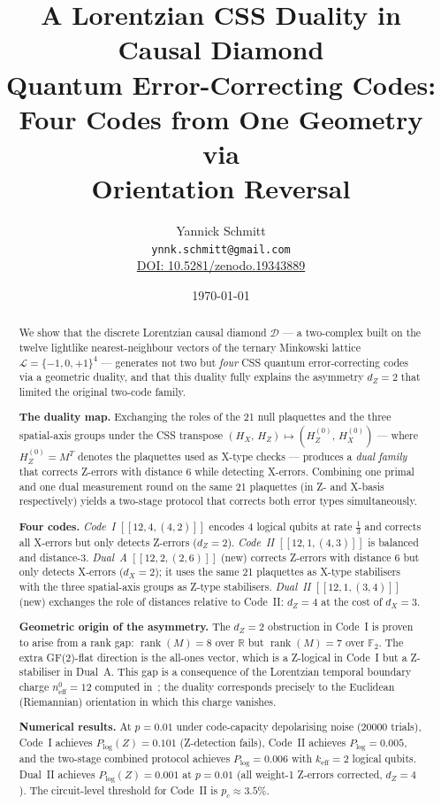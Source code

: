 \documentclass[12pt,a4paper]{article}
\title{\Large\bfseries A Lorentzian CSS Duality in Causal Diamond\\[4pt]
Quantum Error-Correcting Codes:\\[4pt]
Four Codes from One Geometry via\\[4pt]
Orientation Reversal}
\author{Yannick Schmitt \\ 
\texttt{ynnk.schmitt@gmail.com} \\
\vspace{4pt} 
\href{https://doi.org/10.5281/zenodo.19343889}{DOI: 10.5281/zenodo.19343889}}
\date{\today}
\theoremstyle{plain}
\theoremstyle{definition}
\theoremstyle{remark}
\newcommand{\GFtwo}{\mathbb{F}_2}
\newcommand{\R}{\mathbb{R}}
\newcommand{\rank}{\operatorname{rank}}
\newcommand{\CD}{\mathscr{D}}
\newcommand{\Lat}{\mathscr{L}}
\begin{document}
\maketitle

\begin{abstract}
We show that the discrete Lorentzian causal diamond $\CD$ — a two-complex
built on the twelve lightlike nearest-neighbour vectors of the ternary
Minkowski lattice $\Lat = \{-1,0,+1\}^4$ — generates not two but
\emph{four} CSS quantum error-correcting codes via a geometric duality,
and that this duality fully explains the asymmetry $d_Z = 2$ that limited
the original two-code family.

\vspace{1em}\noindent\textbf{The duality map.}
Exchanging the roles of the 21 null plaquettes and the three
spatial-axis groups under the CSS transpose
$(H_X,\, H_Z) \mapsto (H_Z^{(0)},\, H_X^{(0)})$ — where $H_Z^{(0)} = M^T$
denotes the plaquettes used as X-type checks — produces a
\emph{dual family} that corrects Z-errors with distance 6 while
detecting X-errors.
Combining one primal and one dual measurement round on the same 21
plaquettes (in Z- and X-basis respectively) yields a two-stage protocol
that corrects both error types simultaneously.

\vspace{1em}\noindent\textbf{Four codes.}
\emph{Code~I} $[[12,4,(4,2)]]$ encodes 4 logical qubits at rate $\tfrac{1}{3}$
and corrects all X-errors but only detects Z-errors ($d_Z=2$).
\emph{Code~II} $[[12,1,(4,3)]]$ is balanced and distance-3.
\emph{Dual~A} $[[12,2,(2,6)]]$ (new) corrects Z-errors with distance 6
but only detects X-errors ($d_X=2$); it uses the same 21 plaquettes as
X-type stabilisers with the three spatial-axis groups as Z-type stabilisers.
\emph{Dual~II} $[[12,1,(3,4)]]$ (new) exchanges the role of distances
relative to Code~II: $d_Z=4$ at the cost of $d_X=3$.

\vspace{1em}\noindent\textbf{Geometric origin of the asymmetry.}
The $d_Z=2$ obstruction in Code~I is proven to arise from a rank gap:
$\rank(M)=8$ over $\R$ but $\rank(M)=7$ over $\GFtwo$.
The extra GF(2)-flat direction is the all-ones vector,
which is a Z-logical in Code~I but a Z-stabiliser in Dual~A.
This gap is a consequence of the Lorentzian temporal boundary charge
$n_{\mathrm{eff}}^0 = 12$ computed in~\cite{SchmittCD}; the duality
corresponds precisely to the Euclidean (Riemannian) orientation in which
this charge vanishes.

\vspace{1em}\noindent\textbf{Numerical results.}
At $p=0.01$ under code-capacity depolarising noise (20000 trials),
Code~I achieves $P_{\log}(Z)=0.101$ (Z-detection fails),
Code~II achieves $P_{\log}=0.005$, and the two-stage combined protocol
achieves $P_{\log}=0.006$ with $k_{\mathrm{eff}}=2$ logical qubits.
Dual~II achieves $P_{\log}(Z)=0.001$ at $p=0.01$ (all weight-1
Z-errors corrected, $d_Z=4$).
The circuit-level threshold for Code~II is $p_c \approx 3.5\%$.
\end{abstract}
\end{document}
